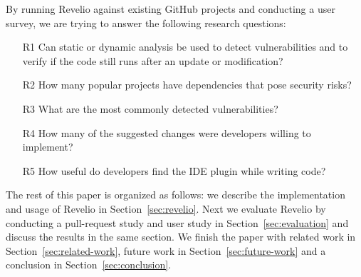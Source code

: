 By running Revelio against existing GitHub projects and conducting a user survey, we are trying to answer the following research questions:
\begin{itemize}
\item [R1] Can static or dynamic analysis be used to detect vulnerabilities and to verify if the code still runs after an update or modification?
\item [R2] How many popular projects have dependencies that pose security risks?
\item [R3] What are the most commonly detected vulnerabilities?
\item [R4] How many of the suggested changes were developers willing to implement?
\item [R5] How useful do developers find the IDE plugin while writing code?
\end{itemize}

The rest of this paper is organized as follows: we describe the implementation and usage of Revelio in Section~\ref{sec:revelio}. Next we evaluate Revelio by conducting a pull-request study and user study in Section~\ref{sec:evaluation} and discuss the results in the same section. We finish the paper with related work in Section~\ref{sec:related-work}, future work in Section~\ref{sec:future-work} and a conclusion in Section~\ref{sec:conclusion}.
